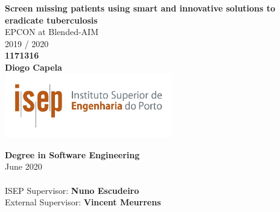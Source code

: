 

\thispagestyle{empty}

	\begin{center}
		

		\vspace*{2.5cm}
		\Large{\textbf{Screen missing patients using smart and innovative solutions to eradicate tuberculosis}}\\
			
		\vspace{0.7cm}
		\normalsize EPCON at Blended-AIM \\
	
		\large
		\vspace*{0.5cm} 2019 / 2020\\
		\vspace*{1.5cm}
		\normalsize \textbf{1171316\\Diogo Capela}\\

	
		\vspace*{2.0cm}
	\includegraphics[width=0.55\textwidth]{images/isep.jpg}
	    \vspace*{1.0cm}

		\Large{\textbf{Degree in Software Engineering}}\\
			    \vspace*{1.5cm}
			\normalsize June 2020 \\ \\
				    \vspace*{1.5cm}
			\normalsize ISEP Supervisor: \textbf{Nuno Escudeiro}\\
			\normalsize External Supervisor:  \textbf{Vincent Meurrens}\\

	
\end{center}

